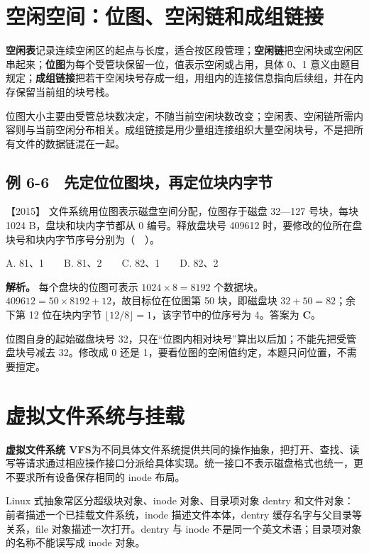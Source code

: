 \section{空闲空间：位图、空闲链和成组链接}\label{os-6-9}

\textbf{空闲表}记录连续空闲区的起点与长度，适合按区段管理；\textbf{空闲链}把空闲块或空闲区串起来；\textbf{位图}为每个受管块保留一位，值表示空闲或占用，具体 0、1 意义由题目规定；\textbf{成组链接}把若干空闲块号存成一组，用组内的连接信息指向后续组，并在内存保留当前组的块号栈。

位图大小主要由受管总块数决定，不随当前空闲块数改变；空闲表、空闲链所需内容则与当前空闲分布相关。成组链接是用少量组连接组织大量空闲块号，不是把所有文件的数据链混在一起。

\subsection{例 6-6　先定位位图块，再定位块内字节}\label{os-ex6-6}

\noindent{}【2015】 文件系统用位图表示磁盘空间分配，位图存于磁盘 32---127 号块，每块 1024 B，盘块和块内字节都从 0 编号。释放盘块号 409612 时，要修改的位所在盘块号和块内字节序号分别为（　）。

A. 81、1　　B. 81、2　　C. 82、1　　D. 82、2


\textbf{解析。} 每个盘块的位图可表示 \(1024\times8=8192\) 个数据块。\(409612=50\times8192+12\)，故目标位在位图第 50 块，即磁盘块 \(32+50=82\)；余下第 12 位在块内字节 \(\lfloor12/8\rfloor=1\)，该字节中的位序号为 4。答案为 \textbf{C}。

位图自身的起始磁盘块号 32，只在``位图内相对块号''算出以后加；不能先把受管盘块号减去 32。修改成 0 还是 1，要看位图的空闲值约定，本题只问位置，不需要擅定。

\section{虚拟文件系统与挂载}\label{os-6-10}

\textbf{虚拟文件系统 VFS}为不同具体文件系统提供共同的操作抽象，把打开、查找、读写等请求通过相应操作接口分派给具体实现。统一接口不表示磁盘格式也统一，更不要求所有设备保存相同的 inode 布局。

Linux 式抽象常区分超级块对象、inode 对象、目录项对象 dentry 和文件对象：前者描述一个已挂载文件系统，inode 描述文件本体，dentry 缓存名字与父目录等关系，file 对象描述一次打开。dentry 与 inode 不是同一个英文术语；目录项对象的名称不能误写成 inode 对象。

